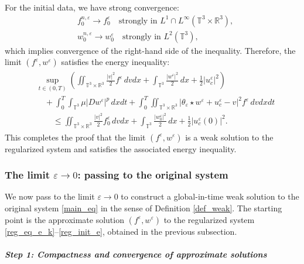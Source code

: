 \documentclass[10pt,reqno]{amsart}
\numberwithin{equation}{section}
\newcommand{\R}{\mathbb R}
\newcommand{\T}{\mathbb T}
\newcommand{\e}{\varepsilon}
\begin{document}
For the initial data, we have strong convergence:
\[
\begin{aligned}
&f_0^{n,\e} \to f_0^\e \quad \text{strongly in } L^1 \cap L^\infty(\T^3 \times \R^3),\\
&w_0^{n,\e} \to w_0^\e \quad \text{strongly in } L^2(\T^3),
\end{aligned}
\]
which implies convergence of the right-hand side of the inequality. Therefore, the limit $(f^\e, w^\e)$ satisfies the energy inequality:
\begin{align}\label{en_eq_e}
\begin{aligned}
&\sup_{t \in (0,T)} \left( \iint_{\T^3 \times \R^3} \frac{|v|^2}{2} f^\e\,dvdx + \int_{\T^3} \frac{|w^\e|^2}{2}\,dx + \frac{1}{2} |u_c^\e|^2 \right) \\
&\quad + \int_0^T \int_{\T^3} \mu|D w^\e|^p\,dxdt + \int_0^T \iint_{\T^3 \times \R^3} |\theta_\e \star w^\e + u_c^\e - v|^2 f^\e\,dvdxdt  \\
&\qquad \le \iint_{\T^3 \times \R^3} \frac{|v|^2}{2} f_0^\e\,dvdx + \int_{\T^3} \frac{|w_0^\e|^2}{2}\,dx + \frac{1}{2} |u_c^\e(0)|^2.  
\end{aligned}
\end{align}
This completes the proof that the limit $(f^\e, w^\e)$ is a weak solution to the regularized system and satisfies the associated energy inequality.


\subsubsection{The limit $\e \to 0$: passing to the original system}

We now pass to the limit $\e \to 0$ to construct a global-in-time weak solution to the original system \eqref{main_eq} in the sense of Definition \ref{def_weak}. The starting point is the approximate solution $(f^\e, w^\e)$ to the regularized system \eqref{reg_eq_e_k}--\eqref{reg_init_e}, obtained in the previous subsection.

\medskip

\paragraph{\it Step 1: Compactness and convergence of approximate solutions}
\end{document}
